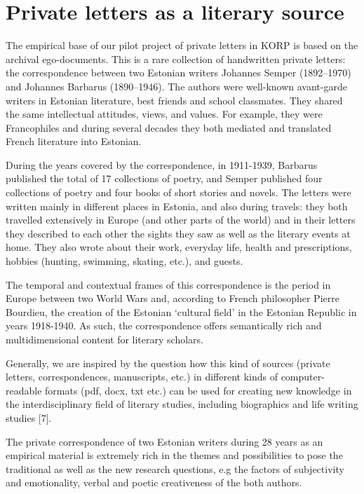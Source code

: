 \documentclass[runningheads]{llncs}
\begin{document}
\section{Private letters as a literary source}

The empirical base of our pilot project of private letters in KORP is based on the archival ego-documents. This is a rare collection of handwritten private letters: the correspondence between two Estonian writers Johannes Semper (1892–1970) and Johannes Barbarus (1890–1946). The authors were well-known avant-garde writers in Estonian literature, best friends and school classmates. They shared the same intellectual attitudes, views, and values. For example, they were Francophiles and during several decades they both mediated and translated French literature into Estonian. 

During the years covered by the correspondence, in 1911-1939, Barbarus published the total of 17 collections of poetry, and Semper published four collections of poetry and four books of short stories and novels. The letters were written mainly in different places in Estonia, and also during travels: they both travelled extensively in Europe (and other parts of the world) and in their letters they described to each other the sights they saw as well as the literary events at home. They also wrote about their work, everyday life, health and prescriptions, hobbies (hunting, swimming, skating, etc.), and guests. 

The temporal and contextual frames of this correspondence is the period in Europe between two World Wars and, according to French philosopher Pierre Bourdieu, the creation of  the Estonian ‘cultural field’ in the Estonian Republic in years 1918-1940. As such, the correspondence offers semantically rich and multidimensional content for literary scholars.  

Generally, we are inspired by the question how this kind of sources (private letters, correspondences, manuscripts, etc.) in different kinds of computer-readable formats (pdf, docx, txt etc.) can be used for creating new knowledge in the interdisciplinary field of literary studies, including biographics and life writing studies [7]. 

The private correspondence of two Estonian writers during 28 years as an empirical material is extremely rich in the themes and possibilities to pose the traditional as well as the new research questions, e.g the factors of subjectivity and emotionality, verbal and poetic creativeness of the both authors.  
\end{document}
